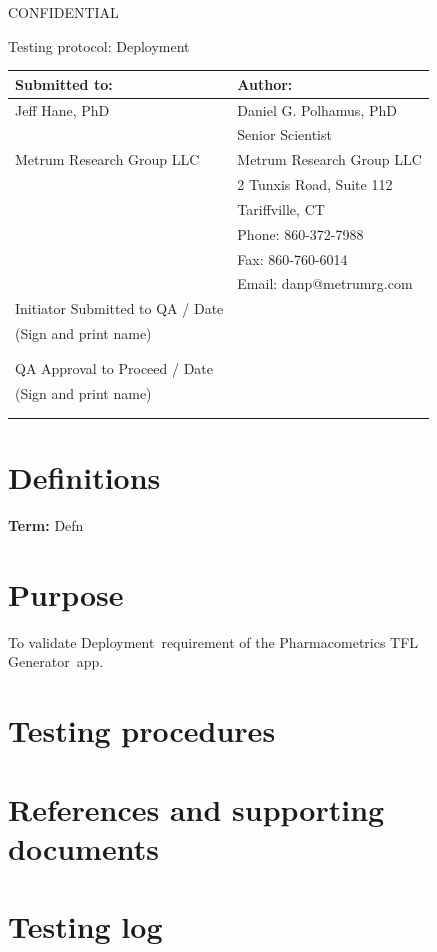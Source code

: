 \documentclass{article}
\newcommand{\tfl}{Pharmacometrics TFL Generator}
\newcommand{\topic}{Deployment}
\newcommand{\testinglog}{logo.pdf}
\begin{document}
\begin{center}
{\large CONFIDENTIAL} 


\vspace*{1cm}


\vspace*{1cm}

{\huge Testing protocol: \topic}
\vspace{3.0cm}

\begin{tabular}{|l|l|}\hline
Submitted to: & Author:\\\hline
Jeff Hane, PhD & Daniel G. Polhamus, PhD \\
&Senior Scientist\\
Metrum Research Group LLC & Metrum Research Group LLC\\
 & 2 Tunxis Road, Suite 112\\
  & Tariffville, CT\\
  & Phone: 860-372-7988 \\
 & Fax: 860-760-6014 \\
  & Email: danp@metrumrg.com \\\hline

  Initiator Submitted to QA  / Date & \\
  
 (Sign and print name) & \\
  & \\
  & \\\hline
  
QA Approval to Proceed / Date & \\

 (Sign and print name) & \\
  & \\
 & \\\hline

\end{tabular}

\end{center}

\newpage
\vspace{3in}
\section*{Definitions}

{\bf Term:} Defn


\section*{Purpose}
To validate \topic\ requirement of the \tfl\ app.

\section*{Testing procedures}

\section*{References and supporting documents}

\section*{Testing log}


\end{document}
